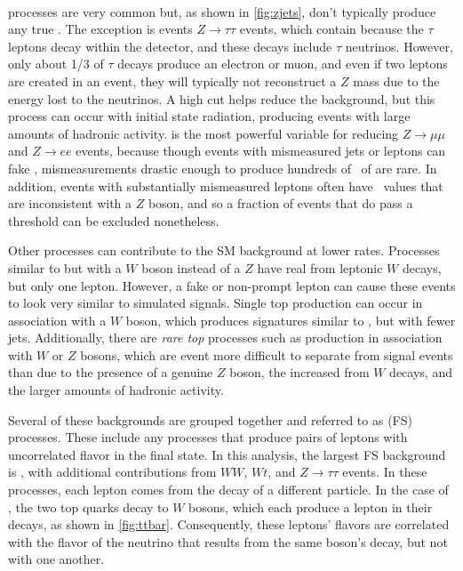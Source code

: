 \paragraph{\dyjets} processes are very common but, as shown in \autoref{fig:zjets}, don't typically produce any true \MET. The exception is events $Z\rightarrow\tau\tau$ events, which contain \MET because the $\tau$ leptons decay within the detector, and these decays include $\tau$ neutrinos. However, only about 1/3 of $\tau$ decays produce an electron or muon, and even if two leptons are created in an event, they will typically not reconstruct a $Z$ mass due to the energy lost to the neutrinos. A high \HT cut helps reduce the \dyjets background, but this process can occur with initial state radiation, producing events with large amounts of hadronic activity. \MET is the most powerful variable for reducing $Z\rightarrow\mu\mu$ and $Z\rightarrow ee$ events, because though events with mismeasured jets or leptons can fake \MET, mismeasurements drastic enough to produce hundreds of \gev~of \met are rare. In addition, events with substantially mismeasured leptons often have \mll~values that are inconsistent with a $Z$ boson, and so a fraction of \dyjets events that do pass a \MET threshold can be excluded nonetheless. 

Other processes can contribute to the \ac{SM} background at lower rates. Processes similar to \dyjets but with a $W$ boson instead of a $Z$ have real \MET from leptonic $W$ decays, but only one lepton. However, a fake or non-prompt lepton can cause these events to look very similar to simulated signals. Single top production can occur in association with a $W$ boson, which produces signatures similar to \ttbar, but with fewer jets.  Additionally, there are \textit{rare top} processes such as \ttbar production in association with $W$ or $Z$ bosons, which are event more difficult to separate from signal events than \ttbar due to the presence of a genuine $Z$ boson, the increased \met from $W$ decays, and the larger amounts of hadronic activity.

Several of these backgrounds are grouped together and referred to as \textit{} (\acs{FS}) processes. These include any processes that produce pairs of leptons with uncorrelated flavor in the final state. In this analysis, the largest \ac{FS} background is \ttbar, with additional contributions from $WW$, $Wt$, and $Z\rightarrow\tau\tau$ events. In these processes, each lepton comes from the decay of a different particle. In the case of \ttbar, the two top quarks decay to $W$ bosons, which each produce a lepton in their decays, as shown in \autoref{fig:ttbar}. Consequently, these leptons' flavors are correlated with the flavor of the neutrino that results from the same boson's decay, but not with one another.

